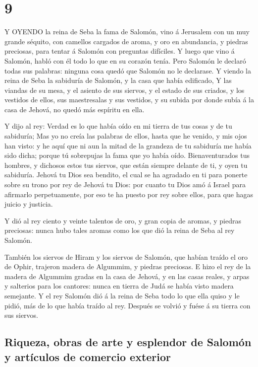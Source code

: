 \hypertarget{section-8}{%
\section{9}\label{section-8}}

 Y OYENDO la reina de Seba la fama de Salomón, vino á
Jerusalem con un muy grande séquito, con camellos cargados de aroma, y
oro en abundancia, y piedras preciosas, para tentar á Salomón con
preguntas difíciles. Y luego que vino á Salomón, habló con él todo lo
que en su corazón tenía.  Pero Salomón le declaró todas sus
palabras: ninguna cosa quedó que Salomón no le declarase.  Y
viendo la reina de Seba la sabiduría de Salomón, y la casa que había
edificado,  Y las viandas de su mesa, y el asiento de sus
siervos, y el estado de sus criados, y los vestidos de ellos, sus
maestresalas y sus vestidos, y su subida por donde subía á la casa de
Jehová, no quedó más espíritu en ella.

 Y dijo al rey: Verdad es lo que había oído en mi tierra de
tus cosas y de tu sabiduría;  Mas yo no creía las palabras
de ellos, hasta que he venido, y mis ojos han visto: y he aquí que ni
aun la mitad de la grandeza de tu sabiduría me había sido dicha; porque
tú sobrepujas la fama que yo había oído.  Bienaventurados
tus hombres, y dichosos estos tus siervos, que están siempre delante de
ti, y oyen tu sabiduría.  Jehová tu Dios sea bendito, el
cual se ha agradado en ti para ponerte sobre su trono por rey de Jehová
tu Dios: por cuanto tu Dios amó á Israel para afirmarlo perpetuamente,
por eso te ha puesto por rey sobre ellos, para que hagas juicio y
justicia.

 Y dió al rey ciento y veinte talentos de oro, y gran copia
de aromas, y piedras preciosas: nunca hubo tales aromas como los que dió
la reina de Seba al rey Salomón.

 También los siervos de Hiram y los siervos de Salomón, que
habían traído el oro de Ophir, trajeron madera de Algummim, y piedras
preciosas.  E hizo el rey de la madera de Algummim gradas
en la casa de Jehová, y en las casas reales, y arpas y salterios para
los cantores: nunca en tierra de Judá se había visto madera semejante.
 Y el rey Salomón dió á la reina de Seba todo lo que ella
quiso y le pidió, más de lo que había traído al rey. Después se volvió y
fuése á su tierra con sus siervos.

\hypertarget{riqueza-obras-de-arte-y-esplendor-de-salomuxf3n-y-artuxedculos-de-comercio-exterior}{%
\subsection{Riqueza, obras de arte y esplendor de Salomón y artículos de
comercio
exterior}\label{riqueza-obras-de-arte-y-esplendor-de-salomuxf3n-y-artuxedculos-de-comercio-exterior}}


